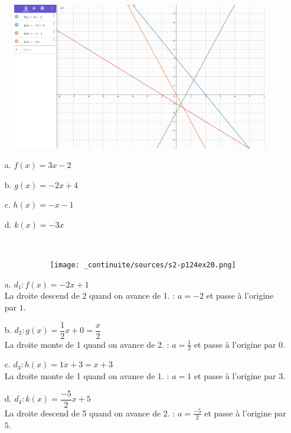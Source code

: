 \documentclass[11pt]{article}
\begin{document}
\begin{minipage}[t]{0.7\textwidth}
  \begin{figure}[H]
        \centering
        \includegraphics[width=0.9\linewidth]{_continuite/sources/s2-p124ex16.png}
  \end{figure}
\end{minipage}
\begin{minipage}[t]{0.3\textwidth}
\begin{enumerate}
    \item[a.] $f(x) = 3x - 2$
    \item[b.] $g(x) = -2x + 4$
    \item[c.] $h(x) = -x - 1$
    \item[d.] $k(x) = -3x$
\end{enumerate}
\end{minipage}

\newpage

 \\

\begin{minipage}[t]{0.5\textwidth}
  \begin{figure}[H]
        \centering
        \texttt{[image: \_continuite/sources/s2-p124ex20.png]}
  \end{figure}
\end{minipage}
\begin{minipage}[t]{0.5\textwidth}

\begin{enumerate}
    \item[a.] $d_1 : f(x) = -2x + 1$ \\
    La droite descend de 2 quand on avance de 1. : $a=-2$ et passe à l'origine par $1$. 
    \item[b.] $d_2 : g(x) = \dfrac{1}{2}x + 0 = \dfrac{x}{2}$\\
    La droite monte de 1 quand on avance de 2. : $a=\tfrac{1}{2}$ et passe à l'origine par $0$. 
    \item[c.] $d_3 : h(x) = 1x + 3 = x + 3$\\
    La droite monte de 1 quand on avance de 1. : $a=1$ et passe à l'origine par $3$. 
    \item[d.] $d_4 : k(x) = \dfrac{-5}{2}x + 5$\\
    La droite descend de 5 quand on avance de 2. : $a=\tfrac{-5}{2}$ et passe à l'origine par $5$. 
\end{enumerate}
\end{minipage}
\end{document}

